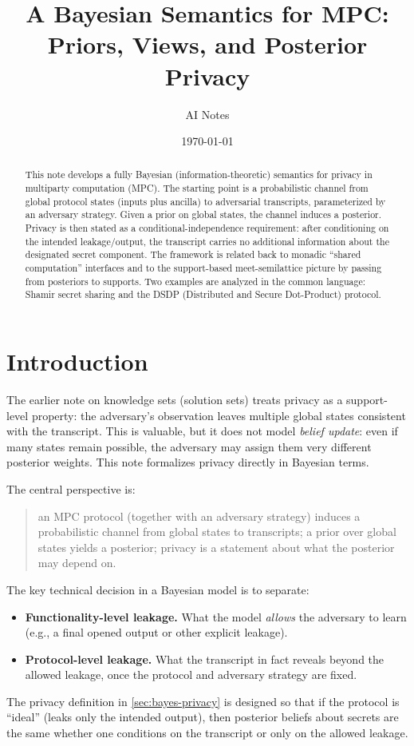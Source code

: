 \documentclass[11pt,a4paper]{article}
\title{A Bayesian Semantics for MPC: Priors, Views, and Posterior Privacy}
\author{AI Notes}
\date{\today}
\theoremstyle{definition}
\theoremstyle{remark}
\begin{document}
\maketitle

\begin{abstract}
This note develops a fully Bayesian (information-theoretic) semantics for privacy in multiparty computation (MPC). The starting point is a probabilistic channel from global protocol states (inputs plus ancilla) to adversarial transcripts, parameterized by an adversary strategy. Given a prior on global states, the channel induces a posterior. Privacy is then stated as a conditional-independence requirement: after conditioning on the intended leakage/output, the transcript carries no additional information about the designated secret component. The framework is related back to monadic ``shared computation'' interfaces and to the support-based meet-semilattice picture by passing from posteriors to supports. Two examples are analyzed in the common language: Shamir secret sharing and the DSDP (Distributed and Secure Dot-Product) protocol.
\end{abstract}

\section{Introduction}
\label{sec:introduction}

The earlier note on knowledge sets (solution sets) treats privacy as a support-level property: the adversary's observation leaves multiple global states consistent with the transcript. This is valuable, but it does not model \emph{belief update}: even if many states remain possible, the adversary may assign them very different posterior weights. This note formalizes privacy directly in Bayesian terms.

The central perspective is:
\begin{quote}
an MPC protocol (together with an adversary strategy) induces a probabilistic channel from global states to transcripts; a prior over global states yields a posterior; privacy is a statement about what the posterior may depend on.
\end{quote}

The key technical decision in a Bayesian model is to separate:
\begin{itemize}[leftmargin=2em]
  \item \textbf{Functionality-level leakage.} What the model \emph{allows} the adversary to learn (e.g., a final opened output or other explicit leakage).
  \item \textbf{Protocol-level leakage.} What the transcript in fact reveals beyond the allowed leakage, once the protocol and adversary strategy are fixed.
\end{itemize}
The privacy definition in \cref{sec:bayes-privacy} is designed so that if the protocol is ``ideal'' (leaks only the intended output), then posterior beliefs about secrets are the same whether one conditions on the transcript or only on the allowed leakage.
\end{document}
